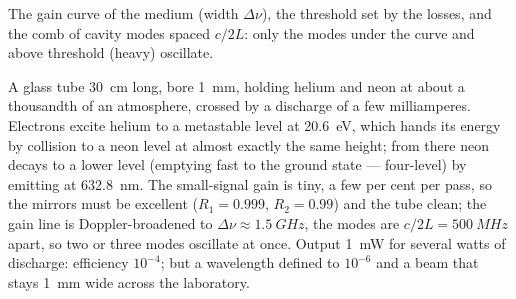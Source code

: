 \begin{omfigure}

{\small The gain curve of the medium (width $\Delta\nu$), the threshold
set by the losses, and the comb of cavity modes spaced $c/2L$: only the
modes under the curve and above threshold (heavy) oscillate.}
\end{omfigure}

\begin{example}\label{ex:b2:laser:hene}
A glass tube \qty{30}{cm} long, bore \qty{1}{mm}, holding helium and
neon at about a thousandth of an atmosphere, crossed by a discharge of
a few milliamperes. Electrons excite helium to a metastable level at
\qty{20.6}{eV}, which hands its energy by collision to a neon level at
almost exactly the same height; from there neon decays to a lower level
(emptying fast to the ground state --- four-level) by emitting at
\qty{632.8}{nm}. The small-signal gain is tiny, a few per cent per
pass, so the mirrors must be excellent ($R_1 = 0.999$, $R_2 = 0.99$)
and the tube clean; the gain line is Doppler-broadened to
$\Delta\nu \approx \qty{1.5}{GHz}$, the modes are $c/2L = \qty{500}{MHz}$
apart, so two or three modes oscillate at once. Output \qty{1}{mW} for
several watts of discharge: efficiency $10^{-4}$; but a wavelength
defined to $10^{-6}$ and a beam that stays \qty{1}{mm} wide across the
laboratory.
\end{example}

